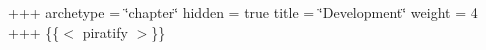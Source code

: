 +++ archetype = \char`\"{}chapter\char`\"{} hidden = true title = \char`\"{}\+Development\char`\"{} weight = 4 +++ \{\{$<$ piratify $>$\}\} 